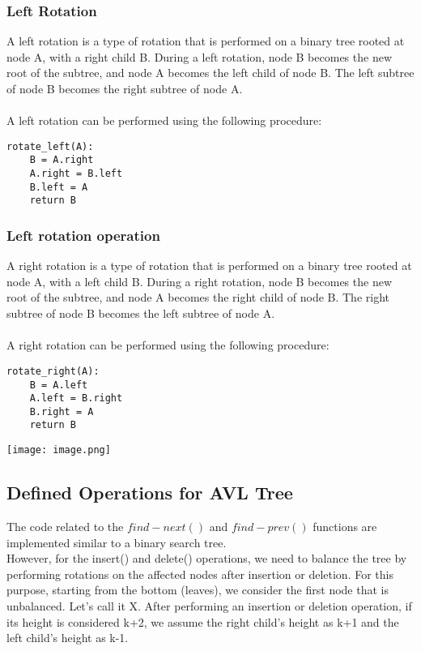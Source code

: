 \documentclass[a4paper, 11pt, oneside]{book} %
\begin{document}
\subsubsection{Left Rotation}
A left rotation is a type of rotation that is performed on a binary tree rooted at node A, with a right child B. During a left rotation, node B becomes the new root of the subtree, and node A becomes the left child of node B. The left subtree of node B becomes the right subtree of node A.
\\
\\
A left rotation can be performed using the following procedure:
\\
\begin{lstlisting}
rotate_left(A):
    B = A.right
    A.right = B.left
    B.left = A
    return B
\end{lstlisting}


\subsubsection{Left rotation operation}
A right rotation is a type of rotation that is performed on a binary tree rooted at node A, with a left child B. During a right rotation, node B becomes the new root of the subtree, and node A becomes the right child of node B. The right subtree of node B becomes the left subtree of node A.
\\
\\
A right rotation can be performed using the following procedure:
\\
\begin{lstlisting}
rotate_right(A):
    B = A.left
    A.left = B.right
    B.right = A
    return B
\end{lstlisting}

\texttt{[image: image.png]}


\subsection{Defined Operations for AVL Tree}
The code related to the $find-next()$ and $find-prev()$ functions are implemented similar to a binary search tree. 
\\
However, for the insert() and delete() operations, we need to balance the tree by performing rotations on the affected nodes after insertion or deletion. For this purpose, starting from the bottom (leaves), we consider the first node that is unbalanced. Let's call it X. After performing an insertion or deletion operation, if its height is considered k+2, we assume the right child's height as k+1 and the left child's height as k-1.
\end{document}
